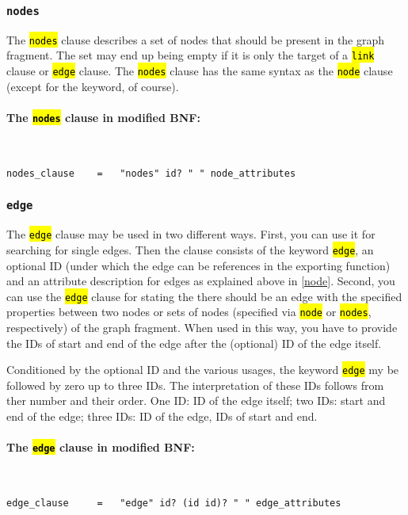 \documentclass[12pt]{scrartcl}
\newcommand{\code}[1]{\hl{\texttt{#1}}}
\begin{document}
\subsubsection{\texttt{nodes}}

The \code{nodes} clause describes a set of nodes that should be present in the graph fragment.
The set may end up being empty if it is only the target of a \code{link} clause or \code{edge} clause.
The \code{nodes} clause has the same syntax as the \code{node} clause (except for the keyword, of course).


\paragraph*{The \code{nodes} clause in modified BNF:}
~
\begin{lstlisting}
nodes_clause    =   "nodes" id? " " node_attributes
\end{lstlisting}





\subsubsection{\texttt{edge}}\label{edge}

The \code{edge} clause may be used in two different ways.
First, you can use it for searching for single edges.
Then the clause consists of the keyword \code{edge}, an optional ID (under which the edge can be references in the exporting function) and an attribute description for edges as explained above in \ref{node}.
Second, you can use the \code{edge} clause for stating the there should be an edge with the specified properties between two nodes or sets of nodes (specified via \code{node} or \code{nodes}, respectively) of the graph fragment.
When used in this way, you have to provide the IDs of start and end of the edge after the (optional) ID of the edge itself.

Conditioned by the optional ID and the various usages, the keyword \code{edge} my be followed by zero up to three IDs.
The interpretation of these IDs follows from ther number and their order.
One ID: ID of the edge itself; two IDs: start and end of the edge; three IDs: ID of the edge, IDs of start and end.


\paragraph*{The \code{edge} clause in modified BNF:}
~
\begin{lstlisting}
edge_clause     =   "edge" id? (id id)? " " edge_attributes
\end{lstlisting}
\end{document}
